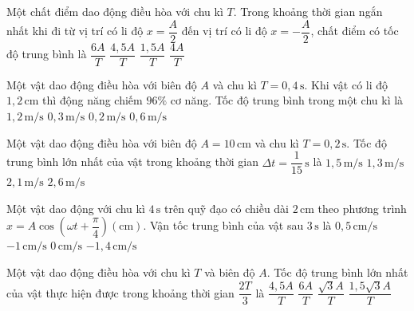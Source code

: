\begin{ex}
Một chất điểm dao động điều hòa với chu kì $T$. Trong khoảng thời gian ngắn nhất khi đi từ vị trí có li độ $x=\dfrac{A}{2}$ đến vị trí có li độ $x=-\dfrac{A}{2}$, chất điểm có tốc độ trung bình là
\choice
{\True $\dfrac{6A}{T}$}
{$\dfrac{4,5A}{T}$}
{$\dfrac{1,5A}{T}$}
{$\dfrac{4A}{T}$}
\end{ex}

\begin{ex}
Một vật dao động điều hòa với biên độ $A$ và chu kì $T=0,4\,\mathrm{s}$. Khi vật có li độ $1,2\,\mathrm{cm}$ thì động năng chiếm $96\%$ cơ năng. Tốc độ trung bình trong một chu kì là
\choice
{$1,2\,\mathrm{m/s}$}
{$0,3\,\mathrm{m/s}$}
{$0,2\,\mathrm{m/s}$}
{\True $0,6\,\mathrm{m/s}$}
\end{ex}

\begin{ex}
Một vật dao động điều hòa với biên độ $A=10\,\mathrm{cm}$ và chu kì $T=0,2\,\mathrm{s}$. Tốc độ trung bình lớn nhất của vật trong khoảng thời gian $\Delta t=\dfrac{1}{15}\,\mathrm{s}$ là
\choice
{$1,5\,\mathrm{m/s}$}
{$1,3\,\mathrm{m/s}$}
{$2,1\,\mathrm{m/s}$}
{\True $2,6\,\mathrm{m/s}$}
\end{ex}

\begin{ex}
Một vật dao động với chu kì $4\,\mathrm{s}$ trên quỹ đạo có chiều dài $2\,\mathrm{cm}$ theo phương trình
$x=A\cos\left(\omega t+\dfrac{\pi}{4}\right) (\mathrm{cm}).$
Vận tốc trung bình của vật sau $3\,\mathrm{s}$ là
\choice
{$0,5\,\mathrm{cm/s}$}
{$-1\,\mathrm{cm/s}$}
{\True $0\,\mathrm{cm/s}$}
{$-1,4\,\mathrm{cm/s}$}
\end{ex}

\begin{ex}
Một vật dao động điều hòa với chu kì $T$ và biên độ $A$. Tốc độ trung bình lớn nhất của vật thực hiện được trong khoảng thời gian $\dfrac{2T}{3}$ là
\choice
{\True $\dfrac{4,5A}{T}$}
{$\dfrac{6A}{T}$}
{$\dfrac{\sqrt{3}A}{T}$}
{$\dfrac{1,5\sqrt{3}A}{T}$}
\end{ex}

